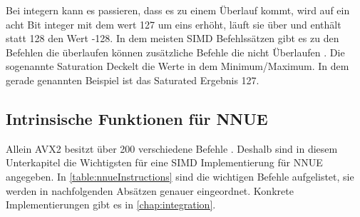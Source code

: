 Bei integern kann es passieren, dass es zu einem Überlauf kommt, wird auf ein acht Bit integer mit dem wert 127 um eins erhöht, läuft sie über und enthält statt 128 den Wert -128. In dem meisten \ac{SIMD} Befehlssätzen gibt es zu den Befehlen die überlaufen können zusätzliche Befehle die nicht Überlaufen \cite{intelIntrinsics}. Die sogenannte Saturation Deckelt die Werte in dem Minimum/Maximum. In dem gerade genannten Beispiel ist das Saturated Ergebnis 127.

\subsection{Intrinsische Funktionen für NNUE}
\label{chap:intrinsicsForNNUE}

Allein \ac{AVX2} besitzt über 200 verschiedene Befehle \cite{intelIntrinsics}. Deshalb sind in diesem Unterkapitel die Wichtigsten für eine \ac{SIMD} Implementierung für NNUE angegeben. In \autoref{table:nnueInstructions} sind die wichtigen Befehle aufgelistet, sie werden in nachfolgenden Absätzen genauer eingeordnet. Konkrete Implementierungen gibt es in \autoref{chap:integration}.

